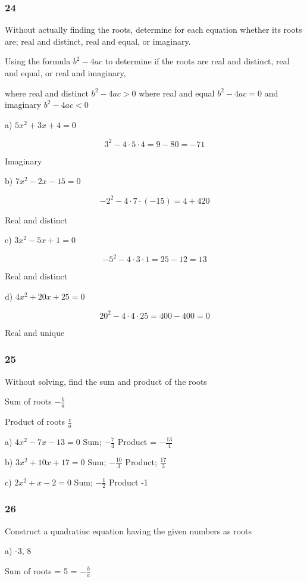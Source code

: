 \documentclass[]{report}
\begin{document}
\subsubsection{24}
Without actually finding the roots, determine for each equation whether its roots are; real and distinct, real and equal, or imaginary.

Using the formula $b^2 - 4ac$ to determine if the roots are real and distinct, real and equal, or real and imaginary,

where real and distinct $b^2 - 4ac > 0$
where real and equal $b^2 - 4ac = 0$
and imaginary $b^2 - 4ac < 0$

a) $5x^2 +3x + 4 = 0$

\[
3^2 - 4\cdot5\cdot4 = 9 - 80 = -71
\]

Imaginary

b) $7x^2 -2x - 15 = 0$

\[
-2^2 - 4\cdot7\cdot(-15)  = 4 + 420
\]

Real and distinct

c) $3x^2 -5x +1 = 0$

\[
-5^2 - 4\cdot3\cdot1 = 25 -12 = 13
\]

Real and distinct

d) $4x^2 + 20x + 25 = 0$

\[
20^2 - 4\cdot4\cdot25 = 400 - 400 = 0
\]

Real and unique

\subsubsection{25}
Without solving, find the sum and product of the roots 

Sum of roots $-\frac{b}{a}$

Product of roots $\frac{c}{a}$

a) $4x^2 - 7x -13 = 0$
Sum; $-\frac{7}{4}$
Product = $-\frac{13}{4}$

b) $3x^2 + 10x + 17 = 0$
Sum; $-\frac{10}{3}$
Product; $\frac{17}{3}$


c) $2x^2 + x - 2 = 0$
Sum; $-\frac{1}{2}$
Product -1

\subsubsection{26}

Construct a quadratiuc equation having the given numbers as roots

a) -3, 8

Sum of roots = 5  = $-\frac{b}{a}$
\end{document}

